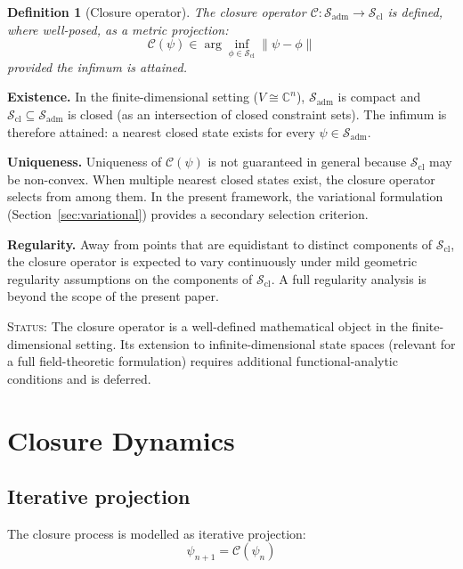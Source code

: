 \documentclass[12pt]{article}
\newtheorem{definition}[theorem]{Definition}
\newcommand{\Ccal}{\mathcal{C}}
\newcommand{\Sadm}{\mathcal{S}_{\mathrm{adm}}}
\newcommand{\Scl}{\mathcal{S}_{\mathrm{cl}}}
\begin{document}
\begin{definition}[Closure operator]\label{def:closure}
The closure operator $\Ccal : \Sadm \to \Scl$ is defined, where well-posed, as a metric projection:
\begin{equation}\label{eq:closure}
    \Ccal(\psi) \in \arg\inf_{\phi \in \Scl} \|\psi - \phi\|
\end{equation}
provided the infimum is attained.
\end{definition}

\textbf{Existence.} In the finite-dimensional setting ($V \cong \mathbb{C}^n$), $\Sadm$ is compact and $\Scl \subseteq \Sadm$ is closed (as an intersection of closed constraint sets). The infimum is therefore attained: a nearest closed state exists for every $\psi \in \Sadm$.

\textbf{Uniqueness.} Uniqueness of $\Ccal(\psi)$ is not guaranteed in general because $\Scl$ may be non-convex. When multiple nearest closed states exist, the closure operator selects from among them. In the present framework, the variational formulation (Section~\ref{sec:variational}) provides a secondary selection criterion.

\textbf{Regularity.} Away from points that are equidistant to distinct components of $\Scl$, the closure operator is expected to vary continuously under mild geometric regularity assumptions on the components of $\Scl$. A full regularity analysis is beyond the scope of the present paper.

\textsc{Status:} The closure operator is a well-defined mathematical object in the finite-dimensional setting. Its extension to infinite-dimensional state spaces (relevant for a full field-theoretic formulation) requires additional functional-analytic conditions and is deferred.

\section{Closure Dynamics}\label{sec:dynamics}

\subsection{Iterative projection}

The closure process is modelled as iterative projection:
\begin{equation}\label{eq:iteration}
    \psi_{n+1} = \Ccal(\psi_n)
\end{equation}
\end{document}
